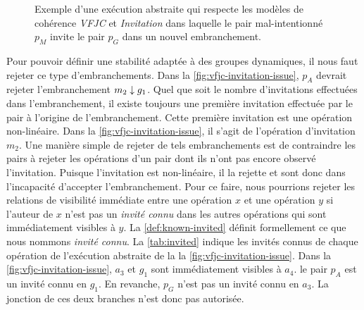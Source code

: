 \begin{figure}[htb]
\centering
{}
\caption{Exemple  d'une exécution abstraite qui respecte les modèles de cohérence \emph{VFJC} et \emph{Invitation} dans laquelle le pair mal-intentionné $p_M$ invite le pair $p_G$ dans un nouvel embranchement.}\label{fig:vfjc-invitation-issue}
\end{figure}

Pour pouvoir définir une stabilité adaptée à des groupes dynamiques, il nous faut rejeter ce type d'embranchements.
Dans la \autoref{fig:vfjc-invitation-issue}, $p_A$ devrait rejeter l'embranchement $m_2 \downarrow g_1$.
Quel que soit le nombre d'invitations effectuées dans l'embranchement, il existe toujours une première invitation effectuée par le pair à l'origine de l'embranchement.
Cette première invitation est une opération non-linéaire.
Dans la \autoref{fig:vfjc-invitation-issue}, il s'agit de l'opération d'invitation $m_2$.
Une manière simple de rejeter de tels embranchements est de contraindre les pairs à rejeter les opérations d'un pair dont ils n'ont pas encore observé l'invitation.
Puisque l'invitation est non-linéaire, il la rejette et sont donc dans l'incapacité d'accepter l'embranchement.
Pour ce faire, nous pourrions rejeter les relations de visibilité immédiate entre une opération $x$ et une opération $y$ si l'auteur de $x$ n'est pas un \emph{invité connu} dans les autres opérations qui sont immédiatement visibles à $y$.
La \autoref{def:known-invited} définit formellement ce que nous nommons \emph{invité connu}.
La \autoref{tab:invited} indique les invités connus de chaque opération de l'exécution abstraite de la la \autoref{fig:vfjc-invitation-issue}.
Dans la \autoref{fig:vfjc-invitation-issue}, $a_3$ et $g_1$ sont immédiatement visibles à $a_4$.
le pair $p_A$ est un invité connu en $g_1$.
En revanche, $p_G$ n'est pas un invité connu en $a_3$.
La jonction de ces deux branches n'est donc pas autorisée.

